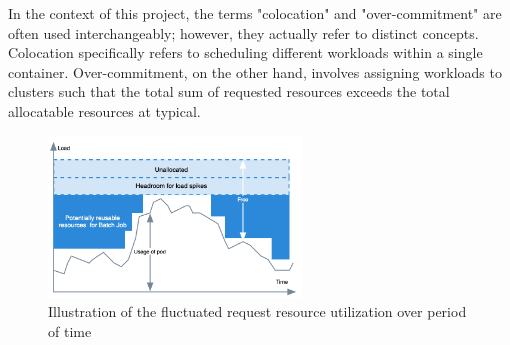 In the context of this project, the terms "colocation" and "over-commitment" are often used interchangeably; however, they actually refer to distinct concepts. Colocation specifically refers to scheduling different workloads within a single container. Over-commitment, on the other hand, involves assigning workloads to clusters such that the total sum of requested resources exceeds the total allocatable resources at typical.

\begin{figure}[h]
    \centering
    \includegraphics[width=0.6\textwidth]{img-load-explain.png}
    \caption{Illustration of the fluctuated request resource utilization over period of time}
    \label{fig:day_use}
\end{figure}